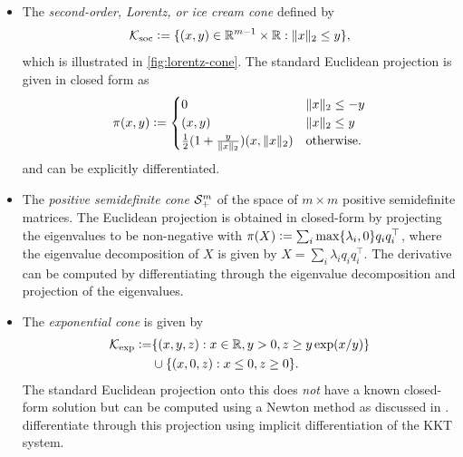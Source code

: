 \begin{itemize}
\item
  The \emph{second-order, Lorentz, or ice cream cone}
  defined by
  \begin{equation}
    {\mathcal{K}}_{\rm soc}\vcentcolon=\{(x,y)\in\mathbb{R}^{m-1}\times\mathbb{R} : \|x\|_2\leq y\},
    \label{eq:lorentz-cone}
  \end{equation}
  which is illustrated in \cref{fig:lorentz-cone}.
  The standard Euclidean projection is given in closed form as
  \begin{equation}
    \pi(x, y) \vcentcolon=
    \begin{cases}
      0 & \|x\|_2 \leq -y \\
      (x,y) & \|x\|_2 \leq y \\
      \frac{1}{2} (1 + \frac{y}{\|x\|_2}) (x, \|x\|_2) & \textrm{otherwise}.
    \end{cases}
  \end{equation}
  and can be explicitly differentiated.
\item The \emph{positive semidefinite cone} ${\mathcal{S}}^m_+$ of the
  space of $m\times m$ positive semidefinite matrices.
  The Euclidean projection is obtained in closed-form
  by projecting the eigenvalues to be non-negative with
  $\pi(X)\vcentcolon=\sum_i\max\{\lambda_i, 0\}q_iq_i^\top$,
  where the eigenvalue decomposition of $X$ is given by
  $X=\sum_i\lambda_iq_iq_i^\top$.
  The derivative can be computed by differentiating
  through the eigenvalue decomposition and projection
  of the eigenvalues.
\item The \emph{exponential cone} is given by
  \begin{equation}
  \begin{aligned}
    {\mathcal{K}}_{\rm exp} \vcentcolon= & \{(x,y,z) : x\in\mathbb{R}, y>0, z\geq y\exp(x/y)\} \\
    & \cup \{(x,0,z): x\leq0, z\geq 0\}.
  \end{aligned}
  \label{eq:exp-cone}
  \end{equation}
  The standard Euclidean projection onto this does
  \emph{not} have a known closed-form solution
  but can be computed using a Newton method
  as discussed in
  \citet[\S6.3.4]{parikh2014proximal}.
  \citet{ali2017semismooth} differentiate through
  this projection using implicit differentiation
  of the KKT system.
\end{itemize}

